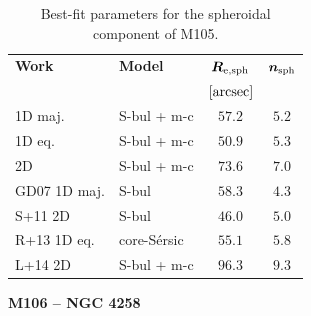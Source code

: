 \documentclass[preprint2]{emulateapj}
\begin{document}
  \begin{table}[h]
  \small
  \caption{Best-fit parameters for the spheroidal component of M105.}
  \begin{center}
  \begin{tabular}{llcc}
  \hline
  {\bf Work} & {\bf Model}   & $\bm R_{\rm e,sph}$    & $\bm n_{\rm sph}$ \\
    &  &  $[\rm arcsec]$ & \\
  \hline
  1D maj. & S-bul + m-c & $57.2$  &  $5.2$ \\
  1D eq.  & S-bul + m-c & $50.9$  &  $5.3$ \\
  2D      & S-bul + m-c & $73.6$  &  $7.0$ \\
  \hline
  GD07 1D maj.         & S-bul & $58.3$  &  $4.3$ \\
  S+11 2D         & S-bul & $46.0$  &  $5.0$ \\
  R+13 1D eq.         & core-S\'ersic & $55.1$  &  $5.8$ \\
  L+14 2D         & S-bul + m-c & $96.3$  &  $9.3$ \\
  \hline
  \end{tabular}
  \end{center}
  \label{tab:m105}
  \end{table}


  \clearpage\newpage\noindent
  {\bf M106 -- NGC 4258 \\} 
  
\end{document}
